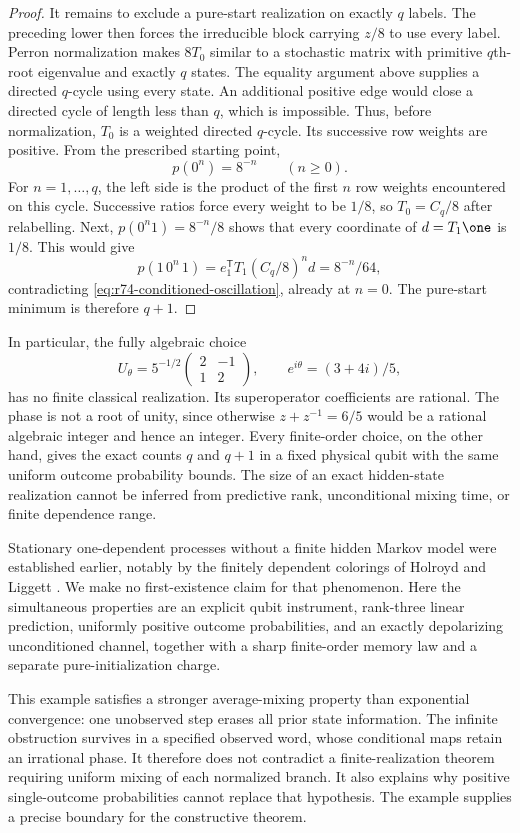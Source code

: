 \begin{proof}
It remains to exclude a pure-start realization on exactly $q$ labels.
The preceding lower then forces the irreducible block carrying $z/8$
to use every label. Perron normalization makes $8T_0$ similar to a
stochastic matrix with primitive $q$th-root eigenvalue and exactly $q$
states. The equality argument above supplies a directed $q$-cycle using
every state. An additional positive edge would close a directed cycle of
length less than $q$, which is impossible. Thus, before normalization,
$T_0$ is a weighted directed $q$-cycle. Its successive row weights are
positive. From the prescribed starting point,
\[
 p(0^n)=8^{-n}\qquad(n\ge0).
\]
For $n=1,\ldots,q$, the left side is the product of the first $n$ row
weights encountered on this cycle. Successive ratios force every weight
to be $1/8$, so $T_0=C_q/8$ after relabelling. Next,
$p(0^n1)=8^{-n}/8$ shows that every coordinate of $d=T_1\one$ is
$1/8$. This would give
\[
 p(1\,0^n\,1)
 =e_1^{\mathsf T}T_1(C_q/8)^nd
 =8^{-n}/64,
\]
contradicting \eqref{eq:r74-conditioned-oscillation}, already at $n=0$.
The pure-start minimum is therefore $q+1$.
\end{proof}

In particular, the fully algebraic choice
\[
 U_\theta=5^{-1/2}\begin{pmatrix}2&-1\\1&2\end{pmatrix},
 \qquad e^{i\theta}=(3+4i)/5,
\]
has no finite classical realization. Its superoperator coefficients are
rational. The phase is not a root of unity, since otherwise
$z+z^{-1}=6/5$ would be a rational algebraic integer and hence an integer.
Every finite-order choice, on the other hand, gives the exact counts
$q$ and $q+1$ in a fixed physical qubit with the same uniform outcome
probability bounds. The size of an exact hidden-state realization cannot be inferred
from predictive rank, unconditional mixing time, or finite dependence
range.

Stationary one-dependent processes without a finite hidden Markov model
were established earlier, notably by the finitely dependent colorings of
Holroyd and Liggett \cite{HolroydLiggett16}. We make no first-existence
claim for that phenomenon. Here the simultaneous properties are an explicit
qubit instrument, rank-three linear prediction, uniformly positive outcome
probabilities, and an exactly depolarizing unconditioned channel, together
with a sharp finite-order memory law and a separate pure-initialization
charge.

This example satisfies a stronger average-mixing property than exponential
convergence: one unobserved step erases all prior state information. The
infinite obstruction survives in a specified observed word, whose
conditional maps retain an irrational phase. It therefore does not
contradict a finite-realization theorem requiring uniform mixing of each
normalized branch. It also explains why positive single-outcome
probabilities cannot replace that hypothesis. The example supplies a precise boundary for the constructive theorem.


